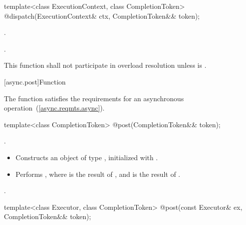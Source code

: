 \begin{itemdecl}
template<class ExecutionContext, class CompletionToken>
  @\DEDUCED@ dispatch(ExecutionContext& ctx, CompletionToken&& token);
\end{itemdecl}

\begin{itemdescr}
\pnum
\completionsig {}.

\pnum
\returns {}.

\pnum
\remarks This function shall not participate in overload resolution
unless  is .
\end{itemdescr}



[async.post]{Function }

%
\pnum
\begin{note} The function  satisfies the requirements for an asynchronous operation~(\ref{async.reqmts.async}). \end{note}

\begin{itemdecl}
template<class CompletionToken>
  @\DEDUCED@ post(CompletionToken&& token);
\end{itemdecl}

\begin{itemdescr}
\pnum
\completionsig {}.

\pnum
\effects
\begin{itemize}
\item
 Constructs an object  of type , initialized with .
\item
 Performs , where  is the result of , and  is the result of .
\end{itemize}

\pnum
\returns {}.
\end{itemdescr}

\begin{itemdecl}
template<class Executor, class CompletionToken>
  @\DEDUCED@ post(const Executor& ex, CompletionToken&& token);
\end{itemdecl}

